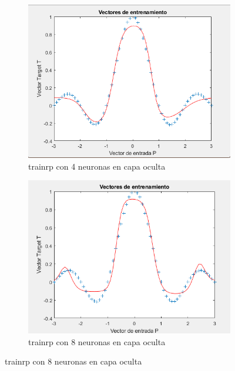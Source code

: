 \documentclass[a4paper, 12pt]{article}
\begin{document}
                \begin{figure}[htp!]
                    \caption{Resilient Backpropagation}
                    \begin{subfigure}{0.49\textwidth}
                        \centering
        		      \includegraphics[width=\textwidth]{figures/parte1/Ej2/Ej2_fig0_codigo_enunciado.png}
                        \caption{trainrp con 4 neuronas en capa oculta}
                    \end{subfigure}
                    \begin{subfigure}{0.49\textwidth}
                        \includegraphics[width=\textwidth]{figures/parte1/Ej2/Ej2_fig9_trainrp_enunciado_8neuronas.png}
                        \caption{trainrp con 8 neuronas en capa oculta}
                    \end{subfigure}
                \end{figure}
\end{document}

